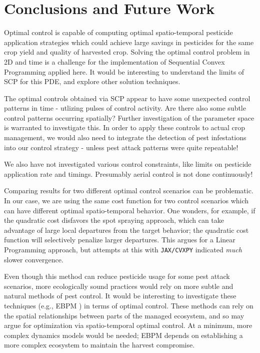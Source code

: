 \documentclass[11pt]{article}
\begin{document}
\section{Conclusions and Future Work}

Optimal control is capable of computing optimal spatio-temporal pesticide application strategies which could achieve large savings in pesticides for the same crop yield and quality of harvested crop. Solving the optimal control problem in 2D and time is a challenge for the implementation of Sequential Convex Programming applied here. It would be interesting to understand the limits of SCP for this PDE, and explore other solution techniques.

The optimal controls obtained via SCP appear to have some unexpected control patterns in time - utlizing pulses of control activity. Are there also some subtle control patterns occurring spatially? Further investigation of the parameter space is warranted to investigate this. In order to apply these controls to actual crop management, we would also need to integrate the detection of pest infestations into our control strategy - unless pest attack patterns were quite repeatable!

We also have not investigated various control constraints, like limits on pesticide application rate and timings. Presumably aerial control is not done continuously!

Comparing results for two different optimal control scenarios can be problematic. In our case, we are using the same cost function for two control scenarios which can have different optimal spatio-temporal behavior. One wonders, for example, if the quadratic cost disfavors the spot spraying approach, which can take advantage of large local departures from the target behavior; the quadratic cost function will selectively penalize larger departures. This argues for a Linear Programming approach, but attempts at this with \texttt{JAX/CVXPY} indicated \textit{much} slower convergence.

Even though this method can reduce pesticide usage for some pest attack scenarios, more ecologically sound practices would rely on more subtle and natural methods of pest control. It would be interesting to investigate these techniques (e.g., EBPM \cite{R3}) in terms of optimal control. These methods can rely on the spatial relationships between parts of the managed ecosystem, and so may argue for optimization via spatio-temporal optimal control. At a minimum, more complex dynamics models would be needed; EBPM depends on establishing a more complex ecosystem to maintain the harvest compromise. 
\end{document}
